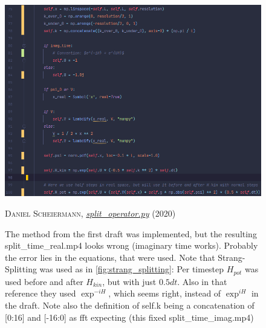 \begin{figure}[H]
    \centering
    \includegraphics[width=1.0\textwidth]{IMAGE/find_the_error.png}\\
    \caption{
      The method from the first draft was implemented, but the resulting split\_time\_real.mp4 looks wrong
      (imaginary time works). Probably the error lies in the equations, that were used.
      Note that Strang-Splitting was used as in \ref{fig:strang_splitting}:
      Per timestep $H_{pot}$ was used before and after $H_{kin}$, but with just $0.5dt$.
      Also in that reference they used $\exp^{-iH}$, which seems right, instead of $\exp^{iH}$ in the draft.
      Note also the definition of self.k being a concatenation of [0:16] and [-16:0] as fft expecting
      (this fixed split\_time\_imag.mp4)
    }
    \textsc{Daniel Scheiermann},
    \emph{\url{split_operator.py}} (2020)
    \label{fig:find_the_error}
\end{figure}


